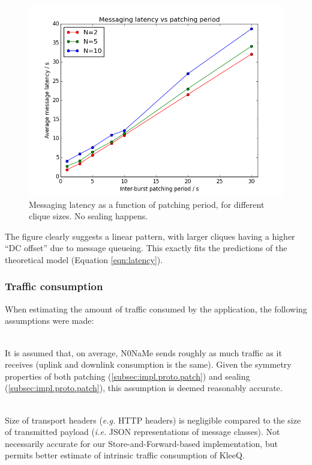 \documentclass[a4paper, 12pt]{report}
\newcommand{\funkytt}{\fontfamily{AnonymousPro}\selectfont}
\begin{document}
\begin{figure}[H]
    \captionsetup{width=0.7\textwidth}
    \centering
    \includegraphics[width=0.7\linewidth]{pics/eval/latency_vs_period.png}
    \caption{\label{fig:latency_vs_period} Messaging latency as a function of patching period, for different clique sizes. No sealing happens.}
\end{figure}

The figure clearly suggests a linear pattern, with larger cliques having a higher ``DC offset'' due to message queueing. This exactly fits the predictions of the theoretical model (Equation \ref{eqn:latency}).


\subsubsection{Traffic consumption}
When estimating the amount of traffic consumed by the application, the following assumptions were made:
\begin{description}[labelindent=0.5cm, leftmargin=1.3cm, rightmargin=0.5cm]
    \item[Symmetry] \hfill \\
        It is assumed that, on average, {\funkytt N0NaMe} sends roughly as much traffic as it receives (uplink and downlink consumption is the same). Given the symmetry properties of both patching (\cref{subsec:impl.proto.patch}) and sealing (\cref{subsec:impl.proto.patch}), this assumption is deemed reasonably accurate.
    \item[Zero-cost transport] \hfill \\
        Size of transport headers (\textit{e.g.} HTTP headers) is negligible compared to the size of transmitted payload (\textit{i.e.} JSON representations of message classes). Not necessarily accurate for our Store-and-Forward-based implementation, but permits better estimate of intrinsic traffic consumption of KleeQ.
\end{description}
\end{document}
